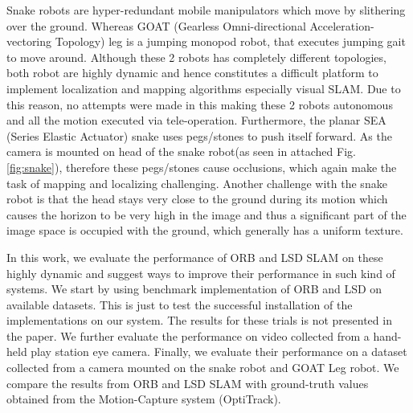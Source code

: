Snake robots are hyper-redundant mobile manipulators which move by slithering over the ground. Whereas GOAT (Gearless Omni-directional Acceleration-vectoring Topology) leg is a jumping monopod robot, that executes jumping gait to move around. Although these 2 robots has completely different topologies, both robot are highly dynamic and hence constitutes a difficult platform to implement localization and mapping algorithms especially visual SLAM. Due to this reason, no attempts were made in this making these 2 robots autonomous and all the motion executed via tele-operation. Furthermore, the planar SEA (Series Elastic Actuator) snake uses pegs/stones to push itself forward. As the camera is mounted on head of the snake robot(as seen in attached Fig.  \ref{fig:snake}), therefore these pegs/stones cause occlusions, which again make the task of mapping and localizing challenging. Another challenge with the snake robot is that the head stays very close to the ground during its motion which causes the horizon to be very high in the image and thus a significant part of the image space is occupied with the ground, which generally has a uniform texture. 

In this work, we evaluate the performance of ORB and LSD SLAM on these highly dynamic and suggest ways to improve their performance in such kind of systems. We start by using benchmark implementation of ORB and LSD on available datasets. This is just to test the successful installation of the implementations on our system. The results for these trials is not presented in the paper. We further evaluate the performance on video collected from a hand-held play station eye camera. Finally, we evaluate their performance on a dataset collected from a camera mounted on the snake robot and GOAT Leg robot. We compare the results from ORB and LSD SLAM with ground-truth values obtained from the Motion-Capture system (OptiTrack).
